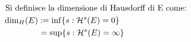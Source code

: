 \documentclass[preview]{standalone}
\begin{document}
\begin{align*}
\text{Si definisce la dimensione di Hausdorﬀ di E come:} \\ \dim_H(E) := \inf\{ s : \mathcal{H}^s(E) = 0\} \hspace{2.85 cm} \\ = \sup\{ s : \mathcal{H}^s(E) = \infty \}  \hspace{2.65 cm}
\end{align*}
\end{document}

